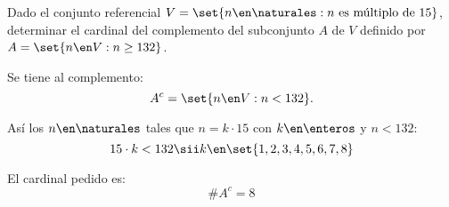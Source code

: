 \begin{enunciado}{\ejercicio}
  Dado el conjunto referencial $V = \set{n \en \naturales : n \text{ es múltiplo de } 15}$, determinar el cardinal del
  complemento del subconjunto $A$ de $V$ definido por $A = \set{n \en V : n \geq 132}$.
\end{enunciado}

Se tiene al complemento:
$$
  A^c  = \set{n \en V : n < 132}.
$$

Así los $n \en \naturales$ tales que $n = k \cdot 15$ con $k\en \enteros$ y  $n < 132$:
$$
  15 \cdot k < 132 \sii k \en \set{1,2,3,4,5,6,7,8}
$$

El cardinal pedido es:
$$
  \#A^c = 8
$$

\begin{aportes}
  \item {}
\end{aportes}
